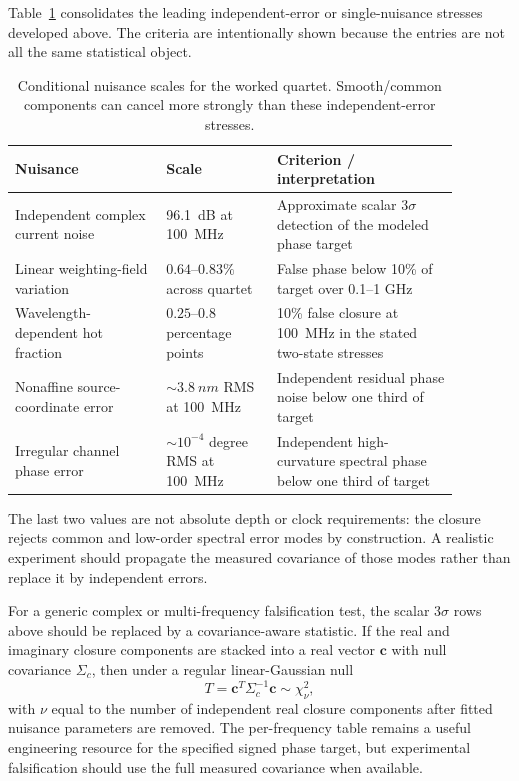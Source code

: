 \documentclass[11pt]{article}
\begin{document}
Table~\ref{tab:nuisance_budget} consolidates the leading independent-error or single-nuisance stresses developed above. The criteria are intentionally shown because the entries are not all the same statistical object.
\begin{table}[H]
\centering
\caption{Conditional nuisance scales for the worked quartet. Smooth/common components can cancel more strongly than these independent-error stresses.}
\label{tab:nuisance_budget}
\begin{tabular}{p{0.30\linewidth}p{0.22\linewidth}p{0.36\linewidth}}
\toprule
Nuisance & Scale & Criterion / interpretation \\
\midrule
Independent complex current noise & \SI{96.1}{dB} at \SI{100}{MHz} & Approximate scalar $3\sigma$ detection of the modeled phase target \\
Linear weighting-field variation & $0.64$--$0.83\%$ across quartet & False phase below 10\% of target over 0.1--1 GHz \\
Wavelength-dependent hot fraction & $0.25$--$0.8$ percentage points & 10\% false closure at \SI{100}{MHz} in the stated two-state stresses \\
Nonaffine source-coordinate error & $\sim3.8~\si{nm}$ RMS at \SI{100}{MHz} & Independent residual phase noise below one third of target \\
Irregular channel phase error & $\sim10^{-4}$ degree RMS at \SI{100}{MHz} & Independent high-curvature spectral phase below one third of target \\
\bottomrule
\end{tabular}
\end{table}
The last two values are not absolute depth or clock requirements: the closure rejects common and low-order spectral error modes by construction. A realistic experiment should propagate the measured covariance of those modes rather than replace it by independent errors.

For a generic complex or multi-frequency falsification test, the scalar $3\sigma$ rows above should be replaced by a covariance-aware statistic. If the real and imaginary closure components are stacked into a real vector $\mathbf c$ with null covariance $\Sigma_c$, then under a regular linear-Gaussian null
\begin{equation}
\boxed{T=\mathbf c^{T}\Sigma_c^{-1}\mathbf c\sim\chi^2_{\nu},}
\label{eq:complex_closure_stat}
\end{equation}
with $\nu$ equal to the number of independent real closure components after fitted nuisance parameters are removed. The per-frequency table remains a useful engineering resource for the specified signed phase target, but experimental falsification should use the full measured covariance when available.
\end{document}
